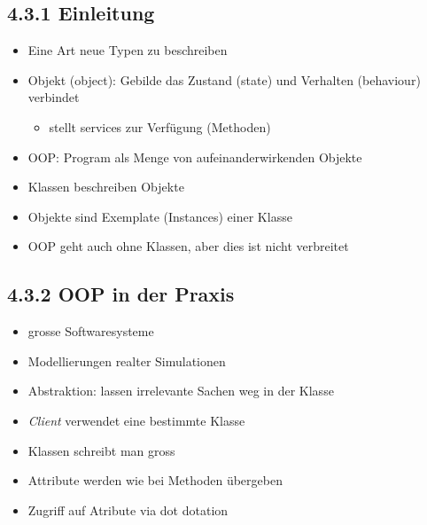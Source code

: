 \documentclass[11pt]{article}
\begin{document}
\subsection{4.3.1 Einleitung}
\label{sec:orgb767301}
\begin{itemize}
\item Eine Art neue Typen zu beschreiben\\
\item Objekt (object): Gebilde das Zustand (state) und Verhalten (behaviour) verbindet\\
\begin{itemize}
\item stellt services zur Verfügung (Methoden)\\
\end{itemize}
\item OOP: Program als Menge von aufeinanderwirkenden Objekte\\
\item Klassen beschreiben Objekte\\
\item Objekte sind Exemplate (Instances) einer Klasse\\
\item OOP geht auch ohne Klassen, aber dies ist nicht verbreitet\\
\end{itemize}

\subsection{4.3.2 OOP in der Praxis}
\label{sec:orge999e2d}
\begin{itemize}
\item grosse Softwaresysteme\\
\item Modellierungen realter Simulationen\\
\item Abstraktion: lassen irrelevante Sachen weg in der Klasse\\
\item \emph{Client} verwendet eine bestimmte Klasse\\
\item Klassen schreibt man gross\\
\item Attribute werden wie bei Methoden übergeben\\
\item Zugriff auf Atribute via dot dotation\\
\end{itemize}
\end{document}
